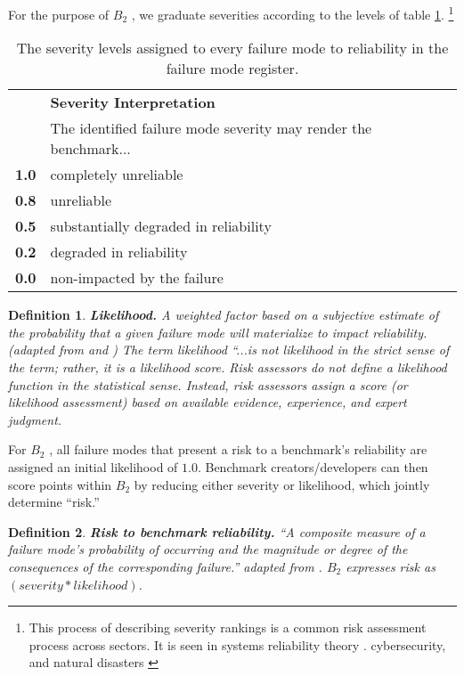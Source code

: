\documentclass{article}
\newtheorem{dfn}{Definition}[section]
\newcommand\bb{$B_2$ }
\begin{document}
For the purpose of \bb, we graduate severities according to the levels of table \ref{tab:severity}. \footnote{This process of describing severity rankings is a common risk assessment process across sectors. It is seen in systems reliability theory \cite{Rausand2004}. cybersecurity, and natural disasters \cite{NaturalDisasterSeverity} }
\begin{table}[!ht]
  \caption{The severity levels assigned to every failure mode to reliability in the failure mode register.}
\label{tab:severity}
  \centering
  \begin{tabular}{lp{10cm}}
    \toprule
    & \textbf{Severity Interpretation} \\
    & The identified failure mode severity may render the benchmark...\\
    \midrule
    \textbf{1.0} & completely unreliable \\
    \textbf{0.8} & unreliable \\
    \textbf{0.5} & substantially degraded in reliability  \\
    \textbf{0.2} & degraded in reliability \\
    \textbf{0.0} & non-impacted by the failure\\
    \bottomrule
  \end{tabular}
\end{table}

\begin{dfn}
{\bf Likelihood.} A weighted factor based on a subjective estimate of the probability that a given failure mode will materialize to impact reliability. (adapted from \cite{cnssi4009} and \cite{Rausand2004}) The term likelihood ``...is not likelihood in the strict sense of the term; rather, it is a likelihood score. Risk assessors do not define a likelihood function in the statistical sense. Instead, risk assessors assign a score (or likelihood assessment) based on available evidence, experience, and expert judgment. 
\end{dfn}

For \bb, all failure modes that present a risk to a benchmark's reliability are assigned an initial likelihood of $1.0$. Benchmark creators/developers can then score points within \bb by reducing either severity or likelihood, which jointly determine ``risk.''

\begin{dfn}
{\bf Risk to benchmark reliability.} ``A composite measure of a failure mode’s probability of occurring and the magnitude or degree of the consequences of the corresponding failure.'' adapted from \cite{nist2024ai}. \bb expresses risk as $(severity*likelihood)$.
\end{dfn}
\end{document}
